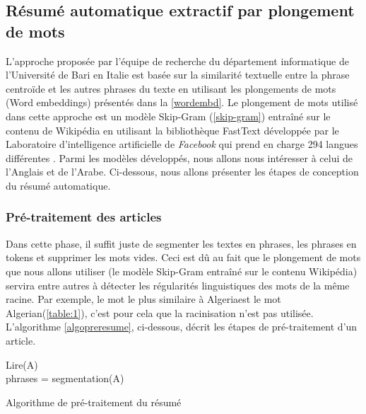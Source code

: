     \subsection{Résumé automatique extractif par plongement de mots}
    L'approche proposée par l'équipe de recherche du département informatique de l'Université de Bari en Italie \cite{notreresume} est basée sur la similarité textuelle entre la phrase centroïde et les autres phrases du texte en utilisant les plongements de mots (Word embeddings) présentés dans la \autoref{wordembd}. Le plongement de mots utilisé dans cette approche est un modèle Skip-Gram (\autoref{skip-gram}) entraîné sur le contenu de Wikipédia en utilisant la bibliothèque FastText développée par le Laboratoire d'intelligence artificielle de \emph{Facebook} qui prend en charge 294 langues différentes \cite{fasttext}. Parmi les modèles développés, nous allons nous intéresser à celui de l'Anglais et de l'Arabe. Ci-dessous, nous allons présenter les étapes de conception du résumé automatique.

        \subsubsection{Pré-traitement des articles}
        Dans cette phase, il suffit juste de segmenter les textes en phrases, les phrases en tokens et supprimer les mots vides. Ceci est dû au fait que le plongement de mots que nous allons utiliser (le modèle Skip-Gram entraîné sur le contenu Wikipédia) servira entre autres à détecter les régularités linguistiques des  mots de la même racine. Par exemple, le mot le plus similaire à \textquotedbl Algeria\textquotedbl est le mot \textquotedbl Algerian\textquotedbl (\autoref{table:1}), c'est pour cela que la racinisation n'est pas utilisée. L'algorithme \autoref{algopreresume}, ci-dessous, décrit les étapes de pré-traitement d'un article.

         \begin{algorithm2e}[H]
          \SetAlgoLined
          Lire(A)\\
          phrases = segmentation(A)\\
         \caption{Algorithme de pré-traitement du résumé}
         \label{algopreresume}
        \end{algorithm2e}

